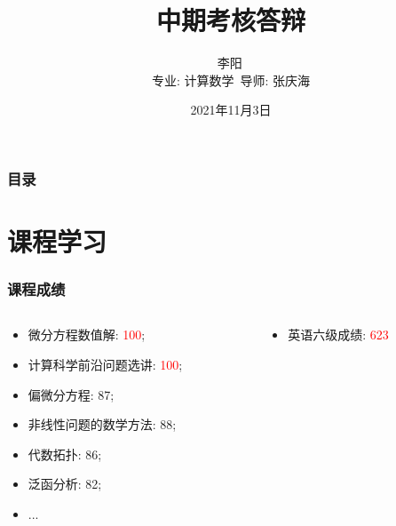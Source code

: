 \documentclass{beamer}
\begin{document}
\begin{CJK*}{UTF8}{gkai}
  \title{中期考核答辩}
  \author{李阳\, \\
    专业: 计算数学\, 导师: 张庆海}
  \date{2021年11月3日}
  \maketitle

  \begin{frame}
    \frametitle{目录}
    \tableofcontents
  \end{frame}

  \section{课程学习}

  \begin{frame}
    \frametitle{课程成绩}
    \begin{columns}
      \begin{column}{.5\linewidth}
        \begin{itemize}
        \item
          微分方程数值解: \textcolor{red}{100};
        \item
          计算科学前沿问题选讲: \textcolor{red}{100};
        \item
          偏微分方程: 87;
        \item
          非线性问题的数学方法: 88;
        \item
          代数拓扑: 86;
        \item
          泛函分析: 82;
        \item
          ...
        \end{itemize}
      \end{column}
      \begin{column}{.5\linewidth}
        \begin{itemize}
        \item
          英语六级成绩: \textcolor{red}{623}
        \end{itemize}
        \begin{center}

\end{center}
\end{column}
\end{columns}
\end{frame}
\end{CJK*}
\end{document}
